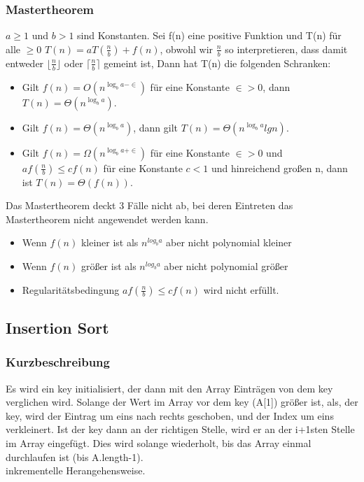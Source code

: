 \documentclass[jou,apacite]{apa6}
\begin{document}
\subsubsection{Mastertheorem}
$a\ge 1$ und $b>1$ sind Konstanten. Sei f(n) eine positive Funktion und T(n) für alle $\ge0$ $T(n) = aT(\frac{n}{b}) + f(n)$, obwohl wir $\frac{n}{b}$ so interpretieren, dass damit entweder $\lfloor{\frac{n}{b}}\rfloor$ oder $\lceil{\frac{n}{b}}\rceil$ gemeint ist, Dann hat T(n) die folgenden Schranken:
\begin{itemize}
    \item Gilt $f(n) = O(n^{\log_b{a-\in}} )$ für eine Konstante $\in > 0$, dann $T(n) = \Theta(n^{\log_b{a}})$.
    \item Gilt $f(n) = \Theta(n^{\log_b{a}})$, dann gilt $T(n) = \Theta(n^{\log_b{a}}lg n)$.
    \item Gilt $f(n) = \Omega(n^{\log_b{a+\in}} )$ für eine Konstante $\in > 0$ und $af(\frac{n}{b})\le cf(n)$ für eine Konstante $c<1$ und hinreichend großen n, dann ist $T(n) = \Theta(f(n))$.
\end{itemize}
Das Mastertheorem deckt 3 Fälle nicht ab, bei deren Eintreten das Mastertheorem nicht angewendet werden kann.
\begin{itemize}
    \item Wenn $f(n)$ kleiner ist als $n^{log_ba}$ aber nicht polynomial kleiner
    \item Wenn $f(n)$ größer ist als $n^{log_ba}$ aber nicht polynomial größer
    \item Regularitätsbedingung $af(\frac{n}{b})\le cf(n)$ wird nicht erfüllt.
\end{itemize}



\subsection{Insertion Sort}

\subsubsection{Kurzbeschreibung}
Es wird ein key initialisiert, der dann mit den Array Einträgen von dem key verglichen wird. Solange der Wert im Array vor dem key (A[1]) größer ist, als, der key, wird der Eintrag um eins nach rechts geschoben, und der Index um eins verkleinert. Ist der key dann an der richtigen Stelle, wird er an der i+1sten Stelle im Array eingefügt. Dies wird solange wiederholt, bis das Array einmal durchlaufen ist (bis A.length-1). \\
inkrementelle Herangehensweise.
\end{document}
